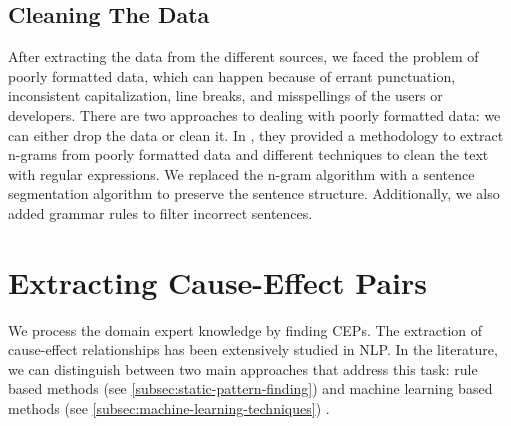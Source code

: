 \subsection{Cleaning The Data}\label{subsec:cleaning-the-data}
After extracting the data from the different sources, we faced the problem of poorly formatted data, which can happen because of errant punctuation, inconsistent capitalization, line breaks, and misspellings of the users or developers.
There are two approaches to dealing with poorly formatted data: we can either drop the data or clean it.
In \cite{mitchell2018web}, they provided a methodology to extract n-grams from poorly formatted data and different techniques to clean the text with regular expressions.
We replaced the n-gram algorithm with a sentence segmentation algorithm to preserve the sentence structure.
Additionally, we also added grammar rules to filter incorrect sentences.


\section{Extracting Cause-Effect Pairs}\label{sec:extracting-cause-effect-pairs}
We process the domain expert knowledge by finding \ac{CEP}s.
The extraction of cause-effect relationships has been extensively studied in \ac{NLP}.
In the literature, we can distinguish between two main approaches that address this task:
rule based methods (see \autoref{subsec:static-pattern-finding}) and machine learning based methods (see \autoref{subsec:machine-learning-techniques}) \cite{guo2020survey, asghar2016automatic}.

